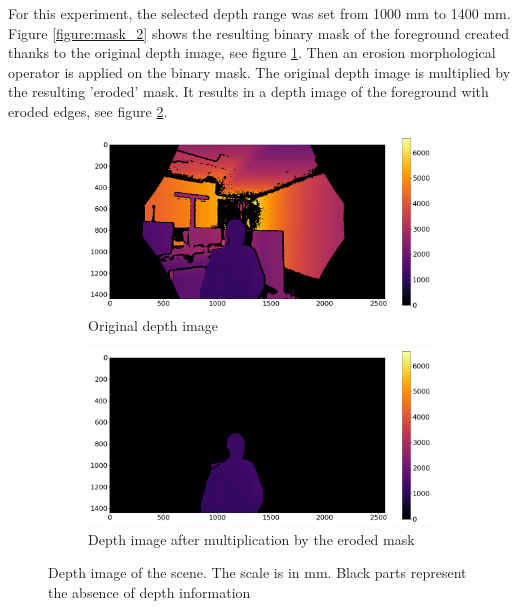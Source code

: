 For this experiment, the selected depth range was set from 1000 mm to 1400 mm. Figure \ref{figure:mask_2} shows the resulting binary mask of the foreground created thanks to the original depth image, see figure \ref{figure:depth_colour}. Then an erosion morphological operator is applied on the binary mask. The original depth image is multiplied by the resulting 'eroded' mask. It results in a depth image of the foreground with eroded edges, see figure \ref{figure:depth_colour_processed}.

\begin{figure}[H]
\centering
  \begin{subfigure}[b]{0.48 \textwidth}
    \includegraphics[width=\textwidth]{images/visual_enhancement/edge/depth_colour.png}
    \caption{Original depth image}
    \label{figure:depth_colour}
  \end{subfigure}
  \hfill
  \begin{subfigure}[b]{0.48 \textwidth}
    \includegraphics[width=\textwidth]{images/visual_enhancement/edge/dept_colour_processed.png}
    \caption{Depth image after multiplication by the eroded mask}
    \label{figure:depth_colour_processed}
  \end{subfigure}
  \caption{Depth image of the scene. The scale is in mm. Black parts represent the absence of depth information}
  \label{figure:dept_colour}
\end{figure}

